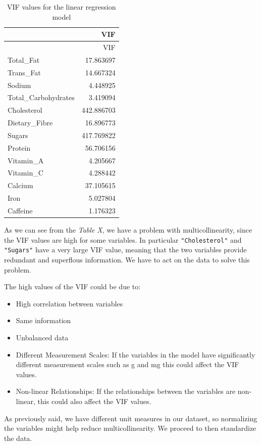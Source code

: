 \documentclass[
]{article}
\begin{document}
\begin{longtable}[]{@{}lr@{}}
\caption{VIF values for the linear regression model}\tabularnewline
\toprule\noalign{}
& VIF \\
\midrule\noalign{}
\endfirsthead
\toprule\noalign{}
& VIF \\
\midrule\noalign{}
\endhead
\bottomrule\noalign{}
\endlastfoot
Total\_Fat & 17.863697 \\
Trans\_Fat & 14.667324 \\
Sodium & 4.448925 \\
Total\_Carbohydrates & 3.419094 \\
Cholesterol & 442.886703 \\
Dietary\_Fibre & 16.896773 \\
Sugars & 417.769822 \\
Protein & 56.706156 \\
Vitamin\_A & 4.205667 \\
Vitamin\_C & 4.288442 \\
Calcium & 37.105615 \\
Iron & 5.027804 \\
Caffeine & 1.176323 \\
\end{longtable}

As we can see from the \emph{Table X}, we have a problem with
multicollinearity, since the VIF values are high for some variables. In
particular \texttt{"Cholesterol"} and \texttt{"Sugars"} have a very
large VIF value, meaning that the two variables provide redundant and
superflous information. We have to act on the data to solve this
problem.

The high values of the VIF could be due to:

\begin{itemize}
\item
  High correlation between variables
\item
  Same information
\item
  Unbalanced data
\item
  Different Measurement Scales: If the variables in the model have
  significantly different measurement scales such as g and mg this could
  affect the VIF values.
\item
  Non-linear Relationships: If the relationships between the variables
  are non-linear, this could also affect the VIF values.
\end{itemize}

As previously said, we have different unit measures in our dataset, so
normalizing the variables might help reduce multicollinearity. We
proceed to then standardize the data.
\end{document}
